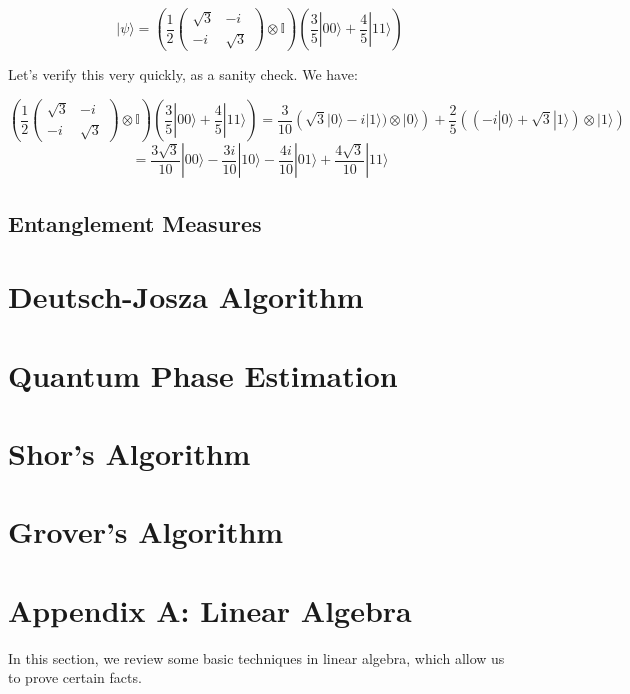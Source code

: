\documentclass[
 10pt,
 amsmath,amssymb,
 notitlepage,
]{revtex4-1}
\begin{document}
$$|\psi\rangle = \left( \frac{1}{2} \begin{pmatrix} \sqrt{3} & -i \\ -i & \sqrt{3} \end{pmatrix} \otimes \mathbb{I} \right) \left( \frac{3}{5} |00\rangle + \frac{4}{5} |11\rangle \right)$$

Let's verify this very quickly, as a sanity check. We have:

$$\left( \frac{1}{2} \begin{pmatrix} \sqrt{3} & -i \\ -i & \sqrt{3} \end{pmatrix} \otimes \mathbb{I} \right) \left( \frac{3}{5} |00\rangle + \frac{4}{5} |11\rangle \right) = \frac{3}{10} \left(\sqrt{3} |0\rangle - i|1\rangle) \otimes |0\rangle\right) + \frac{2}{5} \left( (-i|0\rangle + \sqrt{3}|1\rangle) \otimes |1\rangle \right)$$
$$ = \frac{3 \sqrt{3}}{10} |00\rangle - \frac{3i}{10} |10\rangle - \frac{4i}{10} |01\rangle + \frac{4 \sqrt{3}}{10} |11\rangle$$

\hrulefill

\subsection{Entanglement Measures}

\section{Deutsch-Josza Algorithm}

\section{Quantum Phase Estimation}

\section{Shor's Algorithm}

\section{Grover's Algorithm}

\section{Appendix A: Linear Algebra}

In this section, we review some basic techniques in linear algebra, which allow us to prove certain facts.
\newline
\end{document}
